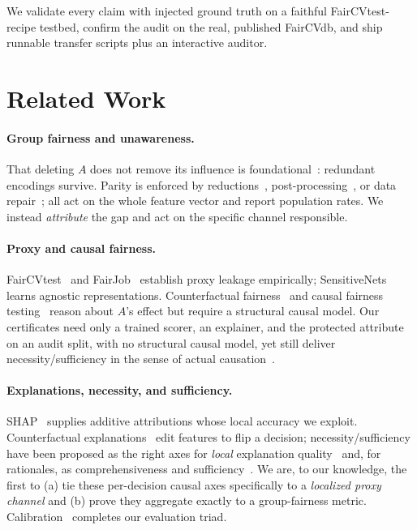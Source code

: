 \documentclass[sn-mathphys-num]{sn-jnl}
\begin{document}
\noindent
We validate every claim with injected ground truth on a faithful FairCVtest-recipe
testbed, confirm the audit on the real, published FairCVdb, and ship runnable
transfer scripts plus an interactive auditor.

\section{Related Work}
\label{sec:related}

\paragraph{Group fairness and unawareness.}
That deleting $A$ does not remove its influence is foundational~\cite{dwork2012fairness,
barocas2017fairness}: redundant encodings survive. Parity is enforced by
reductions~\cite{agarwal2018reductions}, post-processing~\cite{hardt2016equality},
or data repair~\cite{feldman2015certifying}; all act on the whole feature vector
and report population rates. We instead \emph{attribute} the gap and act on the
specific channel responsible.

\paragraph{Proxy and causal fairness.}
FairCVtest~\cite{pena2020faircv,pena2023human} and FairJob~\cite{vladimirova2024fairjob}
establish proxy leakage empirically; SensitiveNets~\cite{serna2021sensitivenets}
learns agnostic representations. Counterfactual
fairness~\cite{kusner2017counterfactual} and causal fairness
testing~\cite{galhotra2017fairness} reason about $A$'s effect but require a
structural causal model. Our certificates need only a trained scorer, an
explainer, and the protected attribute on an audit split, with no structural causal model, yet still
deliver necessity/sufficiency in the sense of actual
causation~\cite{pearl2009causality,halpern2005causes}.

\paragraph{Explanations, necessity, and sufficiency.}
SHAP~\cite{lundberg2017shap,strumbelj2014explaining} supplies additive
attributions whose local accuracy we exploit. Counterfactual
explanations~\cite{wachter2017counterfactual} edit features to flip a decision;
necessity/sufficiency have been proposed as the right axes for \emph{local}
explanation quality~\cite{watson2021local} and, for rationales, as
comprehensiveness and sufficiency~\cite{deyoung2020eraser}. We are, to our
knowledge, the first to (a) tie these per-decision causal axes specifically to a
\emph{localized proxy channel} and (b) prove they aggregate exactly to a
group-fairness metric. Calibration~\cite{guo2017calibration} completes our
evaluation triad.
\end{document}
